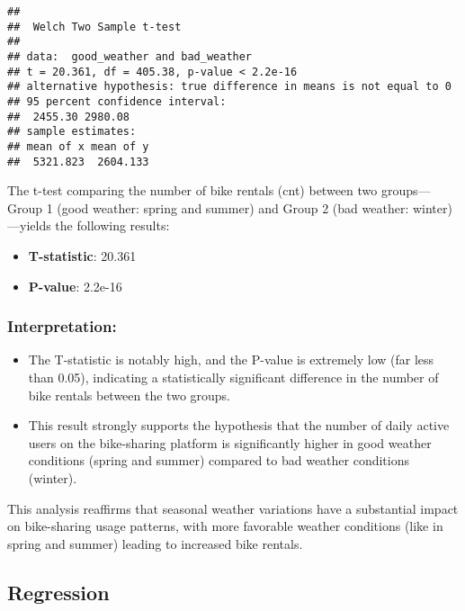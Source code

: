 \documentclass[
]{article}
\begin{document}
\begin{verbatim}
## 
##  Welch Two Sample t-test
## 
## data:  good_weather and bad_weather
## t = 20.361, df = 405.38, p-value < 2.2e-16
## alternative hypothesis: true difference in means is not equal to 0
## 95 percent confidence interval:
##  2455.30 2980.08
## sample estimates:
## mean of x mean of y 
##  5321.823  2604.133
\end{verbatim}

The t-test comparing the number of bike rentals (cnt) between two
groups---Group 1 (good weather: spring and summer) and Group 2 (bad
weather: winter)---yields the following results:

\begin{itemize}
\item
  \textbf{T-statistic}: 20.361
\item
  \textbf{P-value}: 2.2e-16
\end{itemize}

\subsubsection{\texorpdfstring{\textbf{Interpretation:}}{Interpretation:}}\label{interpretation-3}

\begin{itemize}
\item
  The T-statistic is notably high, and the P-value is extremely low (far
  less than 0.05), indicating a statistically significant difference in
  the number of bike rentals between the two groups.
\item
  This result strongly supports the hypothesis that the number of daily
  active users on the bike-sharing platform is significantly higher in
  good weather conditions (spring and summer) compared to bad weather
  conditions (winter).
\end{itemize}

This analysis reaffirms that seasonal weather variations have a
substantial impact on bike-sharing usage patterns, with more favorable
weather conditions (like in spring and summer) leading to increased bike
rentals.

\subsection{Regression}\label{regression}
\end{document}
